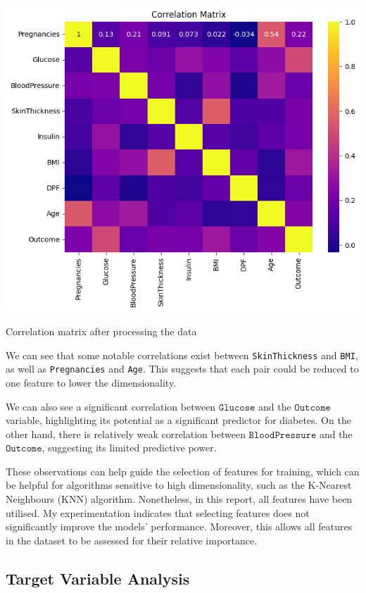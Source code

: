 \documentclass[12pt]{article}
\begin{document}
\begin{center}
    \includegraphics[width=0.8\linewidth]{images/corr - after processing - shorten.png}
    
    \caption{Correlation matrix after processing the data}
    
    \label{fig:corr-matrix-after}
\end{center}

We can see that some notable correlations exist between \texttt{SkinThickness} and \texttt{BMI}, as well as \texttt{Pregnancies} and \texttt{Age}. This suggests that each pair could be reduced to one feature to lower the dimensionality.

We can also see a significant correlation between $\mathtt{Glucose}$ and the $\mathtt{Outcome}$ variable, highlighting its potential as a significant predictor for diabetes. On the other hand, there is relatively weak correlation between $\mathtt{BloodPressure}$ and the $\mathtt{Outcome}$, suggesting its limited predictive power.

These observations can help guide the selection of features for training, which can be helpful for algorithms sensitive to high dimensionality, such as the K-Nearest Neighbours (KNN) algorithm. 
Nonetheless, in this report, all features have been utilised. 
My experimentation indicates that selecting features does not significantly improve the models' performance. 
Moreover, this allows all features in the dataset to be assessed for their relative importance.



\subsection{Target Variable Analysis}
\end{document}
